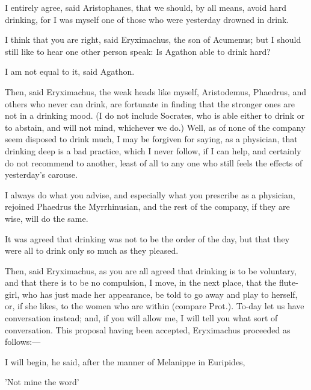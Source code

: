 \documentclass[11pt,letter]{article}
\begin{document}
\par  I entirely agree, said Aristophanes, that we should, by all means, avoid hard drinking, for I was myself one of those who were yesterday drowned in drink.

\par  I think that you are right, said Eryximachus, the son of Acumenus; but I should still like to hear one other person speak: Is Agathon able to drink hard?

\par  I am not equal to it, said Agathon.

\par  Then, said Eryximachus, the weak heads like myself, Aristodemus, Phaedrus, and others who never can drink, are fortunate in finding that the stronger ones are not in a drinking mood. (I do not include Socrates, who is able either to drink or to abstain, and will not mind, whichever we do.) Well, as of none of the company seem disposed to drink much, I may be forgiven for saying, as a physician, that drinking deep is a bad practice, which I never follow, if I can help, and certainly do not recommend to another, least of all to any one who still feels the effects of yesterday's carouse.

\par  I always do what you advise, and especially what you prescribe as a physician, rejoined Phaedrus the Myrrhinusian, and the rest of the company, if they are wise, will do the same.

\par  It was agreed that drinking was not to be the order of the day, but that they were all to drink only so much as they pleased.

\par  Then, said Eryximachus, as you are all agreed that drinking is to be voluntary, and that there is to be no compulsion, I move, in the next place, that the flute-girl, who has just made her appearance, be told to go away and play to herself, or, if she likes, to the women who are within (compare Prot.). To-day let us have conversation instead; and, if you will allow me, I will tell you what sort of conversation. This proposal having been accepted, Eryximachus proceeded as follows:—

\par  I will begin, he said, after the manner of Melanippe in Euripides,

\par  'Not mine the word'
\end{document}
